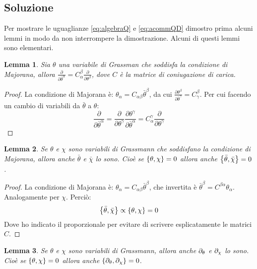 \documentclass[]{scrartcl}
\newtheorem{lemma}{Lemma}
\begin{document}
\subsection*{Soluzione} Per mostrare le uguaglianze \eqref{eq:algebraQ} e \eqref{eq:acommQD} dimostro prima alcuni lemmi
in modo da non interrompere la dimostrazione. Alcuni di questi lemmi sono elementari.

\begin{lemma}
  \label{lem:lemma0}
  Sia $ \theta $ una variabile di Grassman che soddisfa la condizione di Majorana, allora $ \frac{\partial}{\partial \bar{\theta}^\alpha} =
  C^\beta_\alpha  \frac{\partial}{\partial \theta^\beta} $, dove $ C $ è la matrice di coniugazione di carica.
\end{lemma}

\begin{proof}
  La condizione di Majorana è: $ \theta_\alpha = C_{\alpha\beta} \bar{\theta}^\beta $, da cui $ \frac{\partial \theta^\beta}{\partial \bar{\theta}^\gamma}
  = C^\beta_\gamma $. Per cui facendo un cambio di variabili da $ \bar{\theta} $ a $ \theta $:
  \[ \frac{\partial}{\partial \bar{\theta}^\alpha} = \frac{\partial}{\partial \theta^\gamma} \frac{\partial \theta^\gamma}{\partial \bar{\theta}^\alpha}
    = C^\gamma_\alpha  \frac{\partial}{\partial \theta^\gamma} \]
\end{proof}

\begin{lemma}
  \label{lem:lemma1}
  Se $ \theta $ e $ \chi $ sono variabili di Grassmann che soddisfano la condizione di Majorana, allora anche $ \bar{\theta} $ e $ \bar{\chi} $ lo sono.
  Cioè se $ \acomm{\theta}{\chi} = 0 $ allora anche  $ \acomm{\bar{\theta}}{\bar{\chi}} = 0 $.
\end{lemma}

\begin{proof}
  La condizione di Majorana è: $ \theta_\alpha = C_{\alpha\beta} \bar{\theta}^\beta $, che invertita è $ \bar{\theta}^\beta = C^{\beta\alpha} \theta_\alpha $.
  Analogamente per $ \chi $. Perciò:
  \[ \acomm{\bar{\theta}}{\bar{\chi}} \propto \acomm{\theta}{\chi} = 0 \]
  Dove ho indicato il proporzionale per evitare di scrivere esplicatamente le matrici $ C $.
\end{proof}

\begin{lemma}
  \label{lem:lemma2}
  Se $ \theta $ e $ \chi $ sono variabili di Grassmann, allora anche $ \partial_{\theta} $ e $ \partial_{\chi} $ lo sono.
  Cioè se $ \acomm{\theta}{\chi} = 0 $ allora anche  $ \acomm{\p{\theta}}{\p{\chi}} = 0 $.
\end{lemma}
\end{document}
